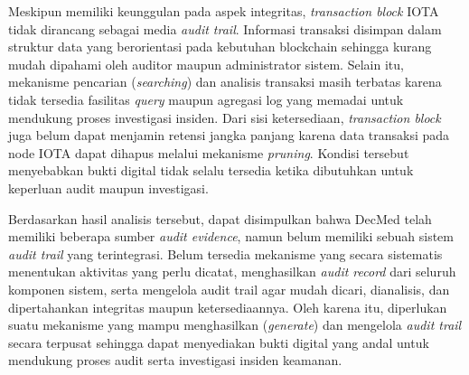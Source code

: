 Meskipun memiliki keunggulan pada aspek integritas, \textit{transaction block} IOTA tidak dirancang sebagai media \textit{audit trail}. Informasi transaksi disimpan dalam struktur data yang berorientasi pada kebutuhan blockchain sehingga kurang mudah dipahami oleh auditor maupun administrator sistem. Selain itu, mekanisme pencarian (\textit{searching}) dan analisis transaksi masih terbatas karena tidak tersedia fasilitas \textit{query} maupun agregasi log yang memadai untuk mendukung proses investigasi insiden. Dari sisi ketersediaan, \textit{transaction block} juga belum dapat menjamin retensi jangka panjang karena data transaksi pada node IOTA dapat dihapus melalui mekanisme \textit{pruning}. Kondisi tersebut menyebabkan bukti digital tidak selalu tersedia ketika dibutuhkan untuk keperluan audit maupun investigasi.

Berdasarkan hasil analisis tersebut, dapat disimpulkan bahwa DecMed telah memiliki beberapa sumber \textit{audit evidence}, namun belum memiliki sebuah sistem \textit{audit trail} yang terintegrasi. Belum tersedia mekanisme yang secara sistematis menentukan aktivitas yang perlu dicatat, menghasilkan \textit{audit record} dari seluruh komponen sistem, serta mengelola audit trail agar mudah dicari, dianalisis, dan dipertahankan integritas maupun ketersediaannya. Oleh karena itu, diperlukan suatu mekanisme yang mampu menghasilkan (\textit{generate}) dan mengelola \textit{audit trail} secara terpusat sehingga dapat menyediakan bukti digital yang andal untuk mendukung proses audit serta investigasi insiden keamanan.